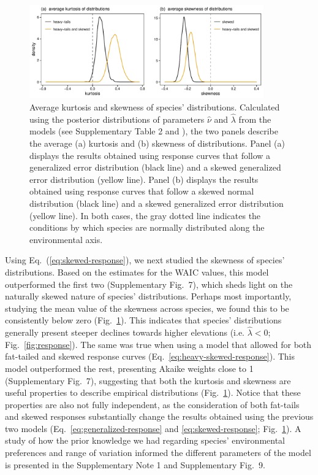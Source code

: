\documentclass[11pt, a4paper]{article}
\begin{document}
\begin{figure}[ht]
  \centering
    \includegraphics[width=0.9\textwidth]{figures/kurto-skew}
    	  \vspace{0.1cm}
	   \caption{Average kurtosis and skewness of species' distributions. Calculated using the posterior distributions of parameters $\hat{\nu}$ and $\hat{\lambda}$ from the models (see Supplementary Table 2 and \citealt{kermanSkewnessKurtosisBounds2013}), the two panels describe the average (a) kurtosis and (b) skewness of distributions. Panel (a) displays the results obtained using response curves that follow a generalized error distribution (black line) and a skewed generalized error distribution (yellow line). Panel (b) displays the results obtained using response curves that follow a skewed normal distribution (black line) and a skewed generalized error distribution (yellow line). In both cases, the gray dotted line indicates the conditions by which species are normally distributed along the environmental axis.}
      \label{fig:kurtosis-skewness}
\end{figure}

Using Eq.~(\ref{eq:skewed-response}), we next studied the skewness of species' distributions. Based on the estimates for the WAIC values, this model outperformed the first two (Supplementary Fig.~7), which sheds light on the naturally skewed nature of species' distributions. Perhaps most importantly, studying the mean value of the skewness across species, we found this to be consistently below zero (Fig.~\ref{fig:kurtosis-skewness}). This indicates that species' distributions generally present steeper declines towards higher elevations (i.e. $\hat{\lambda}<0$; Fig.~\ref{fig:response}). The same was true when using a model that allowed for both fat-tailed and skewed response curves (Eq.~\ref{eq:heavy-skewed-response}). This model outperformed the rest, presenting Akaike weights close to 1 (Supplementary Fig.~7), suggesting that both the kurtosis and skewness are useful properties to describe empirical distributions (Fig.~\ref{fig:kurtosis-skewness}). Notice that these properties are also not fully independent, as the consideration of both fat-tails and skewed responses substantially change the results obtained using the previous two models (Eq.~\ref{eq:generalized-response} and \ref{eq:skewed-response}; Fig.~\ref{fig:kurtosis-skewness}). A study of how the prior knowledge we had regarding species' environmental preferences and range of variation informed the different parameters of the model is presented in the Supplementary Note 1 and Supplementary Fig.~9. %
\end{document}
